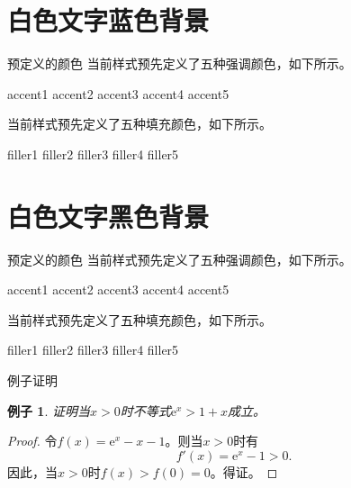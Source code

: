 \documentclass[14pt,notheorems,xcolor={rgb}]{beamer}
\newtheorem{example}[theorem]{例子}
\begin{document}

\begin{frame}[plain]\transboxout
\titlepage
\end{frame}

\section{白色文字蓝色背景}

\begin{frame}{预定义的颜色}
当前样式预先定义了五种强调颜色，如下所示。
\begin{flushleft}
\textcolor{accent1}{accent1}
\textcolor{accent2}{accent2}
\textcolor{accent3}{accent3}
\textcolor{accent4}{accent4}
\textcolor{accent5}{accent5}
\end{flushleft}
当前样式预先定义了五种填充颜色，如下所示。
\begin{flushleft}
\colorbox{filler1}{filler1}
\colorbox{filler2}{filler2}
\colorbox{filler3}{filler3}
\colorbox{filler4}{filler4}
\colorbox{filler5}{filler5}
\end{flushleft}
\end{frame}


\begin{frame}[plain]\transboxout
\titlepage
\end{frame}

\section{白色文字黑色背景}

\begin{frame}{预定义的颜色}
当前样式预先定义了五种强调颜色，如下所示。
\begin{flushleft}
\textcolor{accent1}{accent1}
\textcolor{accent2}{accent2}
\textcolor{accent3}{accent3}
\textcolor{accent4}{accent4}
\textcolor{accent5}{accent5}
\end{flushleft}
当前样式预先定义了五种填充颜色，如下所示。
\begin{flushleft}
\colorbox{filler1}{filler1}
\colorbox{filler2}{filler2}
\colorbox{filler3}{filler3}
\colorbox{filler4}{filler4}
\colorbox{filler5}{filler5}
\end{flushleft}
\end{frame}

\begin{frame}{例子证明}
\begin{example}
证明当$x>0$时不等式$\mathrm{e}^x>1+x$成立。
\end{example}\pause
\begin{proof}
令$f(x)=\mathrm{e}^x-x-1$。则当$x>0$时有
$$f'(x)=\mathrm{e}^x-1>0.$$
因此，当$x>0$时$f(x)>f(0)=0$。得证。
\end{proof}
\end{frame}
\end{document}
